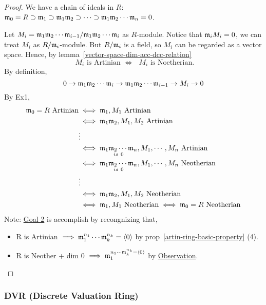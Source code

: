 \begin{proof}
  We have a chain of ideals in $R$:
  $\mathfrak{m}_0 = R \supset \mathfrak{m}_1 \supset \mathfrak{m}_1\mathfrak{m}_2 \supset \dots \supset
  \mathfrak{m}_1\mathfrak{m}_2\dotsm\mathfrak{m}_n = 0$.

  Let $M_i = {\mathfrak{m}_1\mathfrak{m}_2\dotsm\mathfrak{m}_{i-1}}/{\mathfrak{m}_1\mathfrak{m}_2\dotsm\mathfrak{m}_i}$
  as $R$-module.
  Notice that $\mathfrak{m}_i M_i = 0$, we can treat $M_i$ as ${R}/{\mathfrak{m}_i}$-module.
  But ${R}/{\mathfrak{m}_i}$ is a field, so $M_i$ can be regarded as a vector
  space. Hence, by lemma~\ref{vector-space-dim-acc-dcc-relation}
  \[ 
  \text{ $M_i$ is Artinian $\iff$ $M_i$ is Noetherian. } 
  \]
  By definition, 
  $$
  0 \to \mathfrak{m}_1\mathfrak{m}_2\dotsm\mathfrak{m}_i \to \mathfrak{m}_1\mathfrak{m}_2\dotsm\mathfrak{m}_{i-1}
  \to M_i \to 0
  $$
  By Ex1,
  $$
    \begin{aligned}
      \mathfrak{m}_0 = R \text{ Artinian} & \iff \mathfrak{m}_1 , M_1 \text{ Artinian} \\
                & \iff \mathfrak{m}_1 \mathfrak{m}_2 , M_1, M_2 \text{ Artinian} \\
                & \vdots \\
                & \iff \underset{is\ 0}{\mathfrak{m}_1 \mathfrak{m}_2 \cdots \mathfrak{m}_n}, M_1, 
                \cdots, M_n \text{ Artinian} \\
                & \iff \underset{is\ 0}{\mathfrak{m}_1 \mathfrak{m}_2 \cdots \mathfrak{m}_n}, M_1, 
                \cdots, M_n \text{ Neotherian} \\
                & \vdots \\
                & \iff \mathfrak{m}_1 \mathfrak{m}_2 , M_1, M_2 \text{ Neotherian} \\
                & \iff \mathfrak{m}_1 , M_1 \text{ Neotherian} \iff \mathfrak{m}_0 = R \text{ Neotherian}\\
    \end{aligned}
  $$
  Note: \underline{Goal 2} is accomplish by recongnizing that,
  \begin{itemize}
    \item R is Artinian $\implies \mathfrak{m}_1^{n_1}\cdots \mathfrak{m}_k^{n_k} = \langle0\rangle$ by prop~\ref{artin-ring-basic-property} (4).
    \item R is Neother + dim 0 $\implies \mathfrak{m}_1^{n_1\cdots \mathfrak{m}_k^{n_k} = \langle0\rangle}$ by \underline{Observation}.
  \end{itemize}
\end{proof}


\subsubsection{DVR (Discrete Valuation Ring)}

